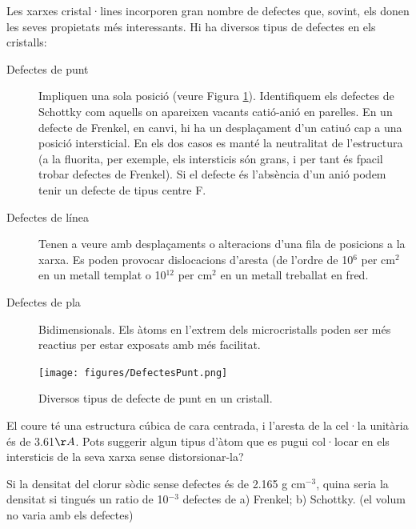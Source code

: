 Les xarxes cristal·lines  incorporen gran nombre de defectes que, sovint, els donen les seves propietats més interessants. Hi ha diversos tipus de defectes en els cristalls:
\begin{description}
\item[Defectes de punt] Impliquen una sola posició (veure Figura \ref{fig:DefectesPunt}). Identifiquem els defectes de Schottky com aquells on apareixen vacants catió-anió en parelles. En un defecte de Frenkel, en canvi, hi ha un desplaçament d'un catiuó cap a una posició intersticial. En els dos casos es manté la neutralitat de l'estructura (a la fluorita, per exemple, els intersticis són grans, i per tant és fpacil trobar defectes de Frenkel). Si el defecte és l'absència d'un anió podem tenir un defecte de tipus centre F.
\item[Defectes de línea] Tenen a veure amb desplaçaments o alteracions d'una fila de posicions a la xarxa. Es poden provocar dislocacions d'aresta (de l'ordre de 10$^6$ per cm$^2$ en un metall templat o 10$^{12}$ per cm$^2$ en un metall treballat en fred.
\item[Defectes de pla] Bidimensionals. Els àtoms en l'extrem dels microcristalls poden ser més reactius per estar exposats amb més facilitat.
\end{description}

\begin{figure}[h]
\centering
\texttt{[image: figures/DefectesPunt.png]}
\caption{Diversos tipus de defecte de punt en un cristall.}
\label{fig:DefectesPunt}
\end{figure}

\begin{exr}
El coure té una estructura cúbica de cara centrada, i l'aresta de la cel·la unitària és de 3.61${\AA}$. Pots suggerir algun tipus d'àtom que es pugui col·locar en els  intersticis de la seva xarxa sense distorsionar-la?
\end{exr}

\begin{exr}
Si la densitat del clorur sòdic sense defectes és de 2.165 g cm$^{-3}$, quina seria la densitat si tingués un ratio de 10$^{-3}$ defectes de a) Frenkel; b) Schottky. (el volum no varia amb els defectes)
\end{exr}


